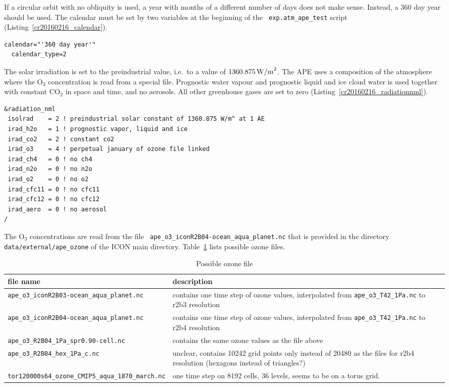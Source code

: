 If a circular orbit with no obliquity is used, a year with months of a
different number of 
days does not make sense. Instead, a 360 day year should be used.
The calendar must be set by two variables at the beginning of the {\tt
  exp.atm\_ape\_test} script (Listing~\ref{cr20160216_calendar}).

\begin{lstlisting}[caption=Calendar for APE ({\tt
    exp.atm\_ape\_test}), label=cr20160216_calendar]
  calendar="'360 day year'"
  calendar_type=2
\end{lstlisting}

The solar irradiation is set to the preindustrial value, i.e.~to a
value of $1360.875\,{\rm W/m}^2$. The APE uses a composition of the
atmosphere where the O$_3$ concentration is read from a special file. Prognostic
water vapour and prognostic liquid and ice cloud water is used
together with constant CO$_2$ in space and time, and no
aerosols. All 
other greenhouse gases are set to zero (Listing~\ref{cr20160216_radiationnml}). 

\begin{lstlisting}[caption=Solar irradiation and composition of
  atmosphere ({\tt exp.atm\_ape\_test}), label=cr20160216_radiationnml] 
&radiation_nml
 isolrad    = 2 ! preindustrial solar constant of 1360.875 W/m^ at 1 AE
 irad_h2o   = 1 ! prognostic vapor, liquid and ice
 irad_co2   = 2 ! constant co2
 irad_o3    = 4 ! perpetual january of ozone file linked
 irad_ch4   = 0 ! no ch4
 irad_n2o   = 0 ! no n2o
 irad_o2    = 0 ! no o2
 irad_cfc11 = 0 ! no cfc11
 irad_cfc12 = 0 ! no cfc12
 irad_aero  = 0 ! no aerosol
/
\end{lstlisting}

The O$_3$ concentrations are read from the file {\tt
  ape\_o3\_iconR2B04-ocean\_aqua\_planet.nc} that is provided in the
directory {\tt data/external/ape\_ozone} of the ICON main directory.
Table~\ref{cr20160216_tabozone} lists possible ozone files.

\begin{table}[ht]\caption{Possible ozone file}\label{cr20160216_tabozone}
\begin{tabular*}{\textwidth}{l@{\extracolsep\fill}p{6.7cm}}\hline
file name & description\\\hline
{\tt ape\_o3\_iconR2B03-ocean\_aqua\_planet.nc} & contains one time
step of ozone values, interpolated from {\tt ape\_o3\_T42\_1Pa.nc} to
r2b3 resolution\\
{\tt ape\_o3\_iconR2B04-ocean\_aqua\_planet.nc} & contains one time
step of ozone values, interpolated from {\tt ape\_o3\_T42\_1Pa.nc} to
r2b4 resolution\\
{\tt ape\_o3\_R2B04\_1Pa\_spr0.90-cell.nc} & contains the same ozone
values as the file above\\
{\tt ape\_o3\_R2B04\_hex\_1Pa\_c.nc} & unclear, contains 10242 grid
points only instead of 20480 as the files for r2b4 resolution
(hexagons instead of triangles?)\\
{\tt tor120000s64\_ozone\_CMIP5\_aqua\_1870\_march.nc} & one time step
on 8192 cells, 36 levels, seems to be on a torus grid.\\
\hline
\end{tabular*}
\end{table}


